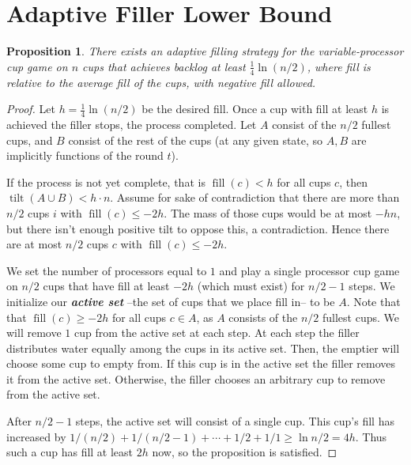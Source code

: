 \documentclass[twocolumn]{article}[10pt]
\newcommand{\defn}[1]{{\textit{\textbf{\boldmath #1}}}\xspace}
\DeclareMathOperator{\tilt}{\text{tilt}}
\DeclareMathOperator{\fil}{\text{fill}}
\newtheorem{proposition}{Proposition}
\begin{document}
\section{Adaptive Filler Lower Bound}\label{sec:adaptive}
\begin{proposition}
\label{prop:adaptiveBase}
  There exists an adaptive filling strategy for the variable-processor cup game
  on $n$ cups that achieves backlog at least $\frac{1}{4}\ln (n/2)$, where fill
  is relative to the average fill of the cups, with negative fill allowed.
\end{proposition}
\begin{proof}
  Let $h = \frac{1}{4}\ln (n/2)$ be the desired fill. Once a cup with fill at
  least $h$ is achieved the filler stops, the process completed.  
  Let $A$ consist of the $n/2$ fullest cups, and $B$ consist of the rest of the
  cups (at any given state, so $A, B$ are implicitly functions of the round
  $t$).

  If the process is not yet complete, that is $\fil(c) < h$ for all cups $c$,
  then $\tilt(A\cup B) < h\cdot n$. Assume for
  sake of contradiction that there are more than $n/2$ cups $i$ with $\fil(c)
  \le -2h$. The mass of those cups would be at most $-hn$, but there isn't
  enough positive tilt to oppose this, a contradiction. Hence there are at most
  $n/2$ cups $c$ with $\fil(c) \le -2h$. 

  We set the number of processors equal to $1$ and play a single processor cup
  game on $n/2$ cups that have fill at least $-2h$ (which must exist) for $n/2
  -1$ steps. We initialize our \defn{active set} --the set of cups that we
  place fill in-- to be $A$. Note that that $\fil(c) \ge -2h$ for all cups $c\in
  A$, as $A$ consists of the $n/2$ fullest cups. We will remove $1$ cup from
  the active set at each step.
  At each step the filler distributes water equally among the cups in its
  active set. Then, the emptier will choose some cup to empty from. If this cup
  is in the active set the filler removes it from the active set. Otherwise, the
  filler chooses an arbitrary cup to remove from the active set.

  After $n/2-1$ steps, the active set will consist of a single cup. This cup's
  fill has increased by $1/(n/2) + 1/(n/2 - 1) + \cdots + 1/2 + 1/1
  \ge \ln n/2 = 4h$. Thus such a cup has fill at least $2h$ now, so the
  proposition is satisfied.
\end{proof}
\end{document}
